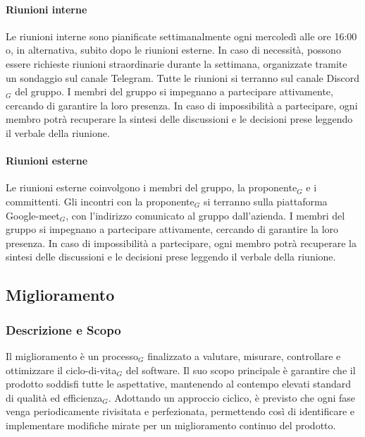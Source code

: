 \documentclass[10pt]{article}
\begin{document}
\begin{justify}
        \paragraph{Riunioni interne}
        Le riunioni interne sono pianificate settimanalmente ogni mercoledì alle ore 16:00 o, in alternativa, subito dopo le riunioni esterne. In caso di necessità, possono essere richieste riunioni straordinarie durante la settimana, organizzate tramite un sondaggio sul canale Telegram. Tutte le riunioni si terranno sul canale Discord$_G$ del gruppo. I membri del gruppo si impegnano a partecipare attivamente, cercando di garantire la loro presenza. In caso di impossibilità a partecipare, ogni membro potrà recuperare la sintesi delle discussioni e le decisioni prese leggendo il verbale della riunione.

        \paragraph{Riunioni esterne}
        Le riunioni esterne coinvolgono i membri del gruppo, la proponente$_G$ e i committenti. Gli incontri con la proponente$_G$ si terranno sulla piattaforma Google-meet$_G$, con l'indirizzo comunicato al gruppo dall'azienda. I membri del gruppo si impegnano a partecipare attivamente, cercando di garantire la loro presenza. In caso di impossibilità a partecipare, ogni membro potrà recuperare la sintesi delle discussioni e le decisioni prese leggendo il verbale della riunione.

    \subsection{Miglioramento}
    \label{miglioramento}
    \subsubsection{Descrizione e Scopo}
    Il miglioramento è un processo$_G$ finalizzato a valutare, misurare, controllare e ottimizzare il ciclo-di-vita$_G$ del software. Il suo scopo principale è garantire che il prodotto soddisfi tutte le aspettative, mantenendo al contempo elevati standard di qualità ed efficienza$_G$.
    Adottando un approccio ciclico, è previsto che ogni fase venga periodicamente rivisitata e perfezionata, permettendo così di identificare e implementare modifiche mirate per un miglioramento continuo del prodotto.\\ 


\end{justify}
\end{document}
